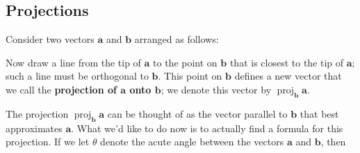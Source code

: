 \documentclass[10pt,]{book}
\newcommand{\terminology}[1]{\textbf{#1}}
\numberwithin{equation}{section}
\newcommand{\vv}[1]{\mathbf{#1}}
\newcommand{\proj}[2]{\operatorname{proj}_{#1} #2}
\begin{document}
\subsection[{Projections}]{Projections}\label{subsection-projections}
\hypertarget{p-1153}{}%
Consider two vectors \(\vv{a}\) and \(\vv{b}\) arranged as follows:%
\begin{figure}
\centering
{
}
\end{figure}
\hypertarget{p-1154}{}%
Now draw a line from the tip of \(\vv{a}\) to the point on \(\vv{b}\) that is closest to the tip of \(\vv{a}\); such a line must be orthogonal to \(\vv{b}\). This point on \(\vv{b}\) defines a new vector that we call the \terminology{projection of \(\vv{a}\) onto \(\vv{b}\)}; we denote this vector by \(\proj{\vv{b}}{\vv{a}}\).%
\begin{figure}
\centering
{
}
\end{figure}
\hypertarget{p-1155}{}%
The projection \(\proj{\vv{b}}{\vv{a}}\) can be thought of as the vector parallel to \(\vv{b}\) that best approximates \(\vv{a}\). What we'd like to do now is to actually find a formula for this projection. If we let \(\theta\) denote the acute angle between the vectors \(\vv{a}\) and \(\vv{b}\), then%
\end{document}
